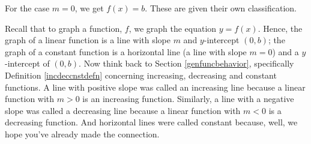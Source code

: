 \medskip


\medskip

For the case $m=0$, we get $f(x) = b$.  These are given their own classification.

\medskip


\medskip

Recall that to graph a function, $f$, we graph the equation $y=f(x)$. Hence, the graph of a linear function is a line with slope $m$ and $y$-intercept $(0,b)$; the graph of a constant function is a horizontal line (a line with slope $m = 0$) and a $y$-intercept of $(0,b)$.  Now think back to Section \ref{genfuncbehavior}, specifically Definition \ref{incdeccnstdefn} concerning increasing, decreasing and constant functions.  A line with positive slope was called an increasing line because a linear function with $m > 0$ is an increasing function.  Similarly, a line with a negative slope was called a decreasing line because a linear function with $m < 0$ is a decreasing function.  And horizontal lines were called constant because, well, we hope you've already made the connection.  

